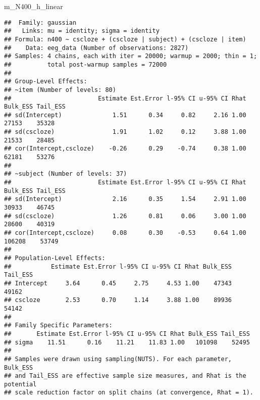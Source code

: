 \documentclass[12pt,ignorenonframetext,aspectratio=169]{beamer}
\newenvironment{Shaded}{\begin{snugshade}}{\end{snugshade}}
\newcommand{\NormalTok}[1]{#1}
\begin{document}
\begin{frame}[fragile]

\tiny

\begin{Shaded}
\begin{Highlighting}[]
\NormalTok{m_N400_h_linear}
\end{Highlighting}
\end{Shaded}

\begin{verbatim}
##  Family: gaussian 
##   Links: mu = identity; sigma = identity 
## Formula: n400 ~ cscloze + (cscloze | subject) + (cscloze | item) 
##    Data: eeg_data (Number of observations: 2827) 
## Samples: 4 chains, each with iter = 20000; warmup = 2000; thin = 1;
##          total post-warmup samples = 72000
## 
## Group-Level Effects: 
## ~item (Number of levels: 80) 
##                        Estimate Est.Error l-95% CI u-95% CI Rhat Bulk_ESS Tail_ESS
## sd(Intercept)              1.51      0.34     0.82     2.16 1.00    27153    35328
## sd(cscloze)                1.91      1.02     0.12     3.88 1.00    21533    28485
## cor(Intercept,cscloze)    -0.26      0.29    -0.74     0.38 1.00    62181    53276
## 
## ~subject (Number of levels: 37) 
##                        Estimate Est.Error l-95% CI u-95% CI Rhat Bulk_ESS Tail_ESS
## sd(Intercept)              2.16      0.35     1.54     2.91 1.00    30933    46745
## sd(cscloze)                1.26      0.81     0.06     3.00 1.00    28600    40319
## cor(Intercept,cscloze)     0.08      0.30    -0.53     0.64 1.00   106208    53749
## 
## Population-Level Effects: 
##           Estimate Est.Error l-95% CI u-95% CI Rhat Bulk_ESS Tail_ESS
## Intercept     3.64      0.45     2.75     4.53 1.00    47343    49162
## cscloze       2.53      0.70     1.14     3.88 1.00    89936    54142
## 
## Family Specific Parameters: 
##       Estimate Est.Error l-95% CI u-95% CI Rhat Bulk_ESS Tail_ESS
## sigma    11.51      0.16    11.21    11.83 1.00   101098    52495
## 
## Samples were drawn using sampling(NUTS). For each parameter, Bulk_ESS
## and Tail_ESS are effective sample size measures, and Rhat is the potential
## scale reduction factor on split chains (at convergence, Rhat = 1).
\end{verbatim}

\end{frame}
\end{document}
